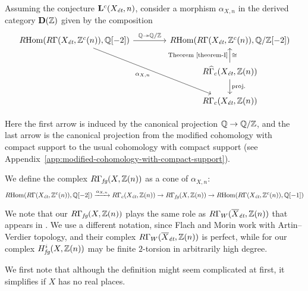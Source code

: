\documentclass{article}
\numberwithin{equation}{section}
\begin{document}
\begin{definition}
  \label{def:RGamma-fg}
  Assuming the conjecture $\mathbf{L}^c (X_\et,n)$, consider a morphism
  $\alpha_{X,n}$ in the derived category $\mathbf{D} (\ZZ)$ given by the
  composition
  \[ \begin{tikzcd}[column sep=4em]
    \RHom (R\Gamma (X_\et, \ZZ^c (n)), \QQ[-2]) \ar{r}{\QQ \twoheadrightarrow \QQ/\ZZ}\ar{ddr}[swap]{\alpha_{X,n}} & \RHom (R\Gamma (X_\et, \ZZ^c (n)), \QQ/\ZZ[-2]) \\
    & R\widehat{\Gamma}_c (X_\et, \ZZ (n)) \ar{u}{\text{Theorem \ref{theorem-I}}}[swap]{\cong} \ar{d}{\text{proj.}} \\
    & R\Gamma_c (X_\et, \ZZ (n))
  \end{tikzcd} \]

  Here the first arrow is induced by the canonical projection $\QQ \to \QQ/\ZZ$,
  and the last arrow is the canonical projection from the modified cohomology
  with compact support to the usual cohomology with compact support
  (see Appendix~\ref{app:modified-cohomology-with-compact-support}).

  We define the complex $R\Gamma_\fg (X, \ZZ(n))$ as a cone of $\alpha_{X,n}$:
  \[ \RHom (R\Gamma (X_\et, \ZZ^c (n)), \QQ [-2]) \xrightarrow{\alpha_{X,n}}
  R\Gamma_c (X_\et, \ZZ (n)) \to
  R\Gamma_\fg (X, \ZZ(n)) \to
  \RHom (R\Gamma (X_\et, \ZZ^c (n)), \QQ [-1]) \]
\end{definition}

\begin{remark}
  We note that our $R\Gamma_\fg (X, \ZZ (n))$ plays the same role as
  $R\Gamma_W (\overline{X}_\et, \ZZ (n))$ that appears in
  \cite[Definition~3.6]{Flach-Morin-2018}. We use a different notation, since
  Flach and Morin work with Artin--Verdier topology, and their complex
  $R\Gamma_W (\overline{X}_\et, \ZZ (n))$ is perfect, while for our complex
  $H^i_\fg (X, \ZZ (n))$ may be finite $2$-torsion in arbitrarily high degree.
\end{remark}

We first note that although the definition might seem complicated at first,
it simplifies if $X$ has no real places.
\end{document}
